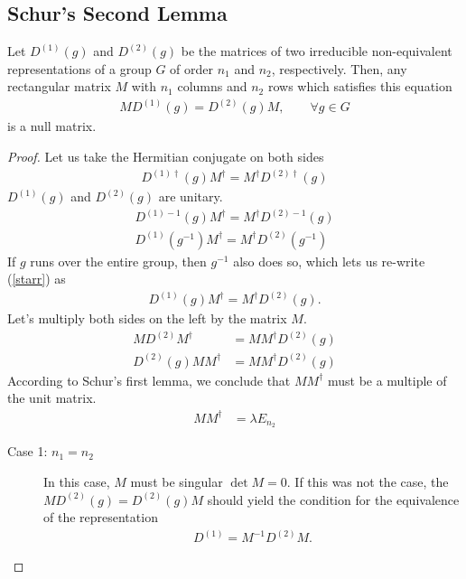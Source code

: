 \subsection{Schur's Second Lemma} %
\label{sub:Schur's Second Lemma}
\begin{theorem}
    Let $D^{(1)}(g)$ and $D^{(2)}(g)$ be the matrices of two irreducible non-equivalent
    representations of a group $G$ of order $n_1$ and $n_2$, respectively. Then, any
    rectangular matrix $M$ with $n_1$ columns and $n_2$ rows which satisfies this
    equation
    \begin{align}
        MD^{(1)}(g)=D^{(2)}(g)M,\qquad\forall g\in G
    \end{align}
    is a null matrix.
\end{theorem}

\begin{proof}
Let us take the Hermitian conjugate on both sides
\begin{align}
    D^{(1)\dagger}(g)M^\dagger=M^\dagger D^{(2)\dagger}(g)
\end{align}
$D^{(1)}(g)$ and $D^{(2)}(g)$ are unitary.
\begin{align}
    D^{(1)-1}(g)M^\dagger=M^\dagger D^{(2)-1}(g)\\
    D^{(1)}(g^{-1})M^\dagger=M^\dagger D^{(2)}(g^{-1})\label{starr}
\end{align}
If $g$ runs over the entire group, then $g^{-1}$ also does so, which lets us
re-write (\autoref{starr}) as
\begin{align}
    D^{(1)}(g)M^\dagger=M^\dagger D^{(2)}(g).
\end{align}
Let's multiply both sides on the left by the matrix $M$.
\begin{align}
    MD^{(2)}M^\dagger&=MM^\dagger D^{(2)}(g)\\
    D^{(2)}(g)MM^\dagger&=MM^\dagger D^{(2)}(g)
\end{align}
According to Schur's first lemma, we conclude that $MM^\dagger$ must be a
multiple of the unit matrix.
\begin{align}
    MM^\dagger&=\lambda E_{n_2}
\end{align}
\begin{description}
    \item[Case 1: $n_1=n_2$]
    In this case, $M$ must be singular $\det M=0$.
    If this was not the case, the $MD^{(2)}(g)=D^{(2)}(g)M$ should yield the
    condition for the equivalence of the representation
    \begin{align}
        D^{(1)}=M^{-1}D^{(2)}M.

\end{align}
\end{description}
\end{proof}
